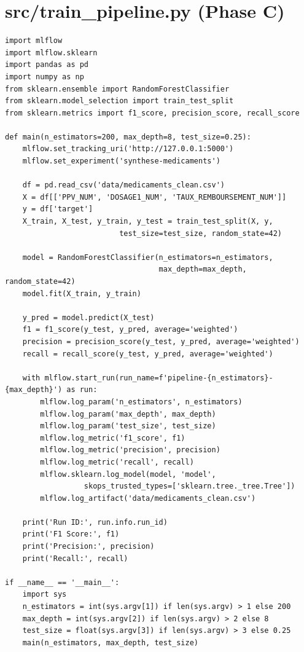 \documentclass[12pt,a4paper]{report}
\begin{document}
\section{src/train_pipeline.py (Phase C)}
\begin{verbatim}
import mlflow
import mlflow.sklearn
import pandas as pd
import numpy as np
from sklearn.ensemble import RandomForestClassifier
from sklearn.model_selection import train_test_split
from sklearn.metrics import f1_score, precision_score, recall_score

def main(n_estimators=200, max_depth=8, test_size=0.25):
    mlflow.set_tracking_uri('http://127.0.0.1:5000')
    mlflow.set_experiment('synthese-medicaments')

    df = pd.read_csv('data/medicaments_clean.csv')
    X = df[['PPV_NUM', 'DOSAGE1_NUM', 'TAUX_REMBOURSEMENT_NUM']]
    y = df['target']
    X_train, X_test, y_train, y_test = train_test_split(X, y,
                          test_size=test_size, random_state=42)

    model = RandomForestClassifier(n_estimators=n_estimators,
                                   max_depth=max_depth, random_state=42)
    model.fit(X_train, y_train)

    y_pred = model.predict(X_test)
    f1 = f1_score(y_test, y_pred, average='weighted')
    precision = precision_score(y_test, y_pred, average='weighted')
    recall = recall_score(y_test, y_pred, average='weighted')

    with mlflow.start_run(run_name=f'pipeline-{n_estimators}-{max_depth}') as run:
        mlflow.log_param('n_estimators', n_estimators)
        mlflow.log_param('max_depth', max_depth)
        mlflow.log_param('test_size', test_size)
        mlflow.log_metric('f1_score', f1)
        mlflow.log_metric('precision', precision)
        mlflow.log_metric('recall', recall)
        mlflow.sklearn.log_model(model, 'model',
                  skops_trusted_types=['sklearn.tree._tree.Tree'])
        mlflow.log_artifact('data/medicaments_clean.csv')

    print('Run ID:', run.info.run_id)
    print('F1 Score:', f1)
    print('Precision:', precision)
    print('Recall:', recall)

if __name__ == '__main__':
    import sys
    n_estimators = int(sys.argv[1]) if len(sys.argv) > 1 else 200
    max_depth = int(sys.argv[2]) if len(sys.argv) > 2 else 8
    test_size = float(sys.argv[3]) if len(sys.argv) > 3 else 0.25
    main(n_estimators, max_depth, test_size)
\end{verbatim}
\end{document}

